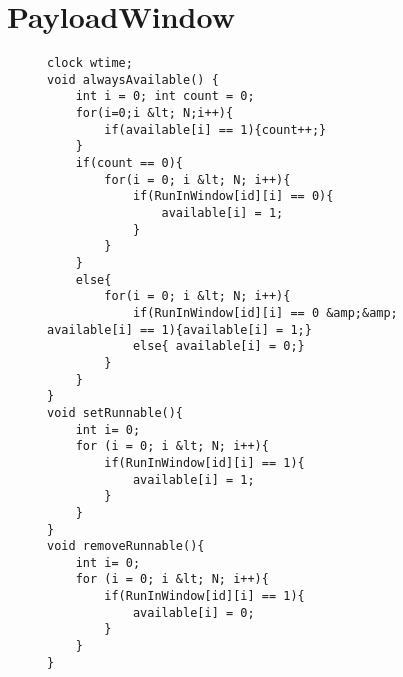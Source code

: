 \section{PayloadWindow}
\begin{figure}[H]
\begin{lstlisting}[language=my_c, caption={Declarations for PayloadWindow template}, label=lst:core_payloadWindow_code]
clock wtime; 
void alwaysAvailable() { 
	int i = 0; int count = 0;
	for(i=0;i &lt; N;i++){
		if(available[i] == 1){count++;}
	}
	if(count == 0){
		for(i = 0; i &lt; N; i++){
			if(RunInWindow[id][i] == 0){
				available[i] = 1;
			}
		}
	}
	else{
		for(i = 0; i &lt; N; i++){
			if(RunInWindow[id][i] == 0 &amp;&amp; available[i] == 1){available[i] = 1;} 
			else{ available[i] = 0;}
		}
	}
}
void setRunnable(){ 
	int i= 0;
	for (i = 0; i &lt; N; i++){
		if(RunInWindow[id][i] == 1){ 
			available[i] = 1; 
		}
	}
} 
void removeRunnable(){
	int i= 0; 
	for (i = 0; i &lt; N; i++){ 
		if(RunInWindow[id][i] == 1){ 
			available[i] = 0;
		}
	}
}
\end{lstlisting}
\end{figure}

